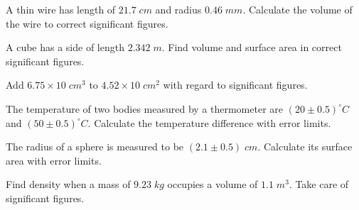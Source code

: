 \documentclass[10pt, a4paper, twoside]{exam}
\begin{document}
\begin{questions}
		\question A thin wire has length of $21.7 \;cm$ and radius $0.46 \;mm$. Calculate the volume of the wire to correct significant figures.
 		
 		\question A cube has a side of length $2.342 \;m$. Find volume and surface area in correct significant figures.
 		
 		\question Add $6.75 \times 10 \;cm^{3}$ to $4.52 \times 10 \;cm^{2}$ with regard to significant figures.
        
        \question The temperature of two bodies measured by a thermometer are $(20 \pm 0.5)^{\circ}C$ and $(50 \pm 0.5)^{\circ}C$. Calculate the temperature difference with error limits.
        
        \question The radius of a sphere is measured to be $(2.1 \pm 0.5) \;cm$. Calculate its surface area with error limits.
        
        \question Find density when a mass of $9.23 \;kg$ occupies a volume of $1.1 \; m^3$. Take care of significant figures.
	\end{questions}
\end{document}
